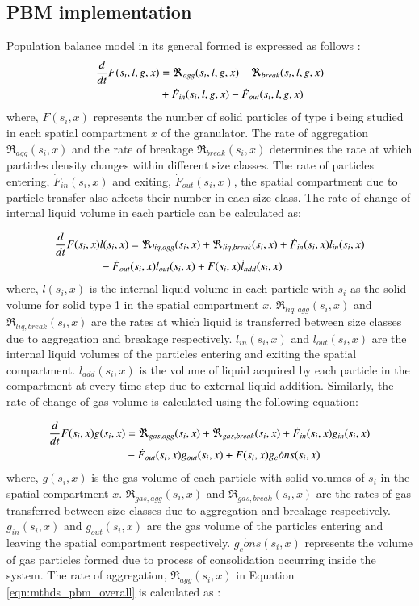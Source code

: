 \documentclass[preprint,10pt,authoryear,review]{elsarticle}
\begin{document}
\begin{linenumbers}
\subsection{PBM implementation}
Population balance model in its general formed is expressed as follows \citep{ramkrishna2014}:
\begin{align}
\frac{d}{dt}F(s_i,l,g,x)&=\Re_{agg}(s_i,l,g,x)+\Re_{break}(s_i,l,g,x)\notag\\ 
&+\dot{F}_{in}(s_i,l,g,x)-\dot{F}_{out}(s_i,l,g,x)
\label{eqn:mthds_pbm_overall} 
\end{align}
where, $F(s_i,x)$ represents the number of solid particles of type i being studied in each spatial 
compartment $x$ of the granulator. The rate of aggregation $\Re_{agg}(s_i,x)$ 
and the rate of breakage $\Re_{break}(s_i,x)$ determines the rate at which particles density
changes within different size classes. The rate of particles entering, $\dot{F}_{in}(s_i,x)$ 
and exiting, $\dot{F}_{out}(s_i,x)$, the spatial compartment due to particle transfer also 
affects their number in each size class. The rate of change of internal liquid volume in each 
particle can be calculated as: 

\begin{align}
\frac{d}{dt}F(s_i,x)&l(s_i,x)= 
\Re_{liq,agg}(s_i,x)+\Re_{liq,break}(s_i,x)+\dot{F}_{in}(s_i,x)l_{in}(s_i,x)\notag\\
&-\dot{F}_{out}(s_i,x)l_{out}(s_i,x)+F(s_i,x)\dot{l}_{add}(s_i,x)
\label{eqn:mthds_pbm_rate} 
\end{align}
where, $l(s_i,x)$ is the internal liquid volume in each particle with ${s_i}$ as the 
solid volume for solid type 1 in the spatial compartment $x$. 
$\Re_{liq,agg}(s_i,x)$ and $\Re_{liq,break}(s_i,x)$ are the rates at which liquid is transferred 
between size classes due to aggregation and breakage respectively. $l_{in}(s_i,x)$ 
and $l_{out}(s_i,x)$ are the internal liquid volumes of the particles entering and exiting 
the spatial compartment. $l_{add}(s_i,x)$ is the volume of liquid acquired 
by each particle in the compartment at every time step due to external liquid addition.
Similarly, the rate of change of gas volume is calculated using the following equation: 

\begin{align}
\frac{d}{dt}F(s_i,x)g(s_i,x)&= 
\Re_{gas,agg}(s_i,x)+\Re_{gas,break}(s_i,x)+\dot{F}_{in}(s_i,x)g_{in}(s_i,x)\notag\\
&-\dot{F}_{out}(s_i,x)g_{out}(s_i,x)+F(s_i,x)\dot{g_cons}(s_i,x)
\label{eqn:mthds_pbm_gas_agg} 
\end{align}
where, $g(s_i,x)$ is the gas volume of each particle with solid volumes of $s_i$ 
in the spatial compartment $x$. $\Re_{gas,agg}(s_i,x)$ and $\Re_{gas,break}(s_i,x)$ are 
the rates of gas transferred between size classes due to aggregation and breakage respectively. 
$g_{in}(s_i,x)$ and $g_{out}(s_i,x)$ are the gas volume of the particles entering and 
leaving the spatial compartment respectively. $\dot{g_cons}(s_i,x)$ represents the volume of 
gas particles formed due to process of consolidation occurring inside the system. The 
rate of aggregation, $\Re_{agg}(s_i,x)$ in Equation \ref{eqn:mthds_pbm_overall} is 
calculated as \citep{Chaturbedi2017}:


\end{linenumbers}
\end{document}
